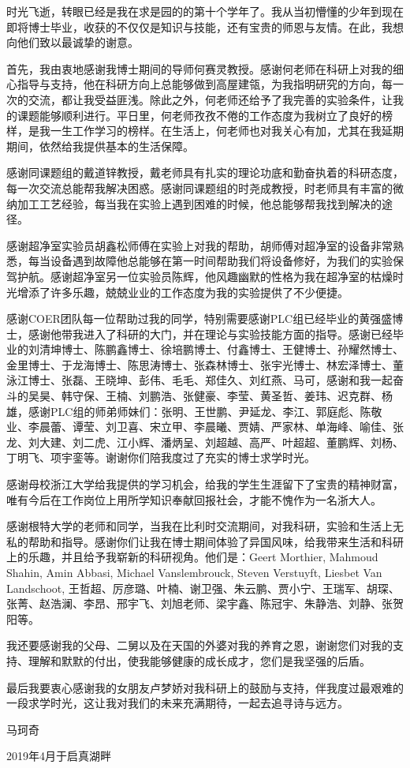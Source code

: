 \begin{thanks}

时光飞逝，转眼已经是我在求是园的的第十个学年了。我从当初懵懂的少年到现在即将博士毕业，收获的不仅仅是知识与技能，还有宝贵的师恩与友情。在此，我想向他们致以最诚挚的谢意。

首先，我由衷地感谢我博士期间的导师何赛灵教授。感谢何老师在科研上对我的细心指导与支持，他在科研方向上总能够做到高屋建瓴，为我指明研究的方向，每一次的交流，都让我受益匪浅。除此之外，何老师还给予了我完善的实验条件，让我的课题能够顺利进行。平日里，何老师孜孜不倦的工作态度为我树立了良好的榜样，是我一生工作学习的榜样。在生活上，何老师也对我关心有加，尤其在我延期期间，依然给我提供基本的生活保障。

感谢同课题组的戴道锌教授，戴老师具有扎实的理论功底和勤奋执着的科研态度，每一次交流总能帮我解决困惑。感谢同课题组的时尧成教授，时老师具有丰富的微纳加工工艺经验，每当我在实验上遇到困难的时候，他总能够帮我找到解决的途径。

感谢超净室实验员胡鑫松师傅在实验上对我的帮助，胡师傅对超净室的设备非常熟悉，每当设备遇到故障他总能够在第一时间帮助我们将设备修好，为我们的实验保驾护航。感谢超净室另一位实验员陈辉，他风趣幽默的性格为我在超净室的枯燥时光增添了许多乐趣，兢兢业业的工作态度为我的实验提供了不少便捷。

感谢COER团队每一位帮助过我的同学，特别需要感谢PLC组已经毕业的黄强盛博士，感谢他带我进入了科研的大门，并在理论与实验技能方面的指导。感谢已经毕业的刘清坤博士、陈鹏鑫博士、徐培鹏博士、付鑫博士、王健博士、孙耀然博士、金里博士、于龙海博士、陈思涛博士、张森林博士、张宇光博士、林宏泽博士、董泳江博士、张磊、王晓坤、彭伟、毛毛、郑佳久、刘红燕、马可，感谢和我一起奋斗的吴昊、韩守保、王楠、刘鹏浩、张健豪、李莹、黄圣哲、姜玮、迟克群、杨雄，感谢PLC组的师弟师妹们：张明、王世鹏、尹延龙、李江、郭庭彪、陈敬业、李晨蕾、谭莹、刘卫喜、宋立甲、李晨曦、贾婧、严家林、单海峰、喻佳、张龙、刘大建、刘二虎、江小辉、潘炳呈、刘超越、高严、叶超超、董鹏辉、刘杨、丁明飞、项宇銮等。谢谢你们陪我度过了充实的博士求学时光。

感谢母校浙江大学给我提供的学习机会，给我的学生生涯留下了宝贵的精神财富，唯有今后在工作岗位上用所学知识奉献回报社会，才能不愧作为一名浙大人。

感谢根特大学的老师和同学，当我在比利时交流期间，对我科研，实验和生活上无私的帮助和指导。感谢你们让我在博士期间体验了异国风味，给我带来生活和科研上的乐趣，并且给予我崭新的科研视角。他们是：Geert Morthier, Mahmoud Shahin, Amin Abbasi, Michael Vanslembrouck, Steven Verstuyft, Liesbet Van Landschoot, 王哲超、厉彦璐、叶楠、谢卫强、朱云鹏、贾小宁、王瑞军、胡琛、张菁、赵浩澜、李昂、邢宇飞、刘旭老师、梁宇鑫、陈冠宇、朱静浩、刘静、张贺阳等。

我还要感谢我的父母、二舅以及在天国的外婆对我的养育之恩，谢谢您们对我的支持、理解和默默的付出，使我能够健康的成长成才，您们是我坚强的后盾。

最后我要衷心感谢我的女朋友卢梦娇对我科研上的鼓励与支持，伴我度过最艰难的一段求学时光，这让我对我们的未来充满期待，一起去追寻诗与远方。


\begin{flushright}
	马珂奇
	
	2019年4月于启真湖畔
\end{flushright}
\end{thanks}
